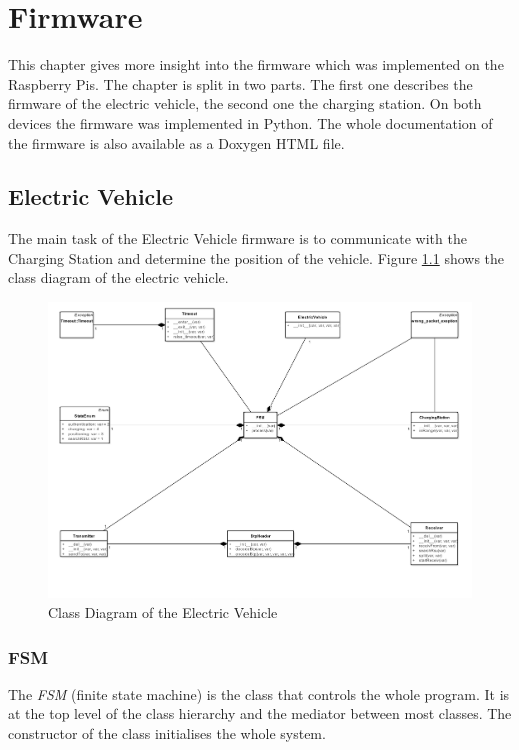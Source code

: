 \chapter{Firmware}\label{ch:firmware}

This chapter gives more insight into the firmware which was implemented on the Raspberry Pis. The chapter is split in two parts. The first one describes the firmware of the electric vehicle, the second one the charging station. On both devices the firmware was implemented in Python. The whole documentation of the firmware is also available as a Doxygen HTML file.

\section{Electric Vehicle}

The main task of the Electric Vehicle firmware is to communicate with the Charging Station and determine the position of the vehicle. Figure \ref{fig:class_ev} shows the class diagram of the electric vehicle.

\begin{figure}[htb]
	\centering
	\includegraphics[width=1\textwidth]{images/class_OBU}
	\caption{Class Diagram of the Electric Vehicle}
	\label{fig:class_ev}
\end{figure}


\subsection{FSM}

The \textit{FSM} (finite state machine) is the class that controls the whole program. It is at the top level of the class hierarchy and the mediator between most classes. The constructor of the class initialises the whole system.

